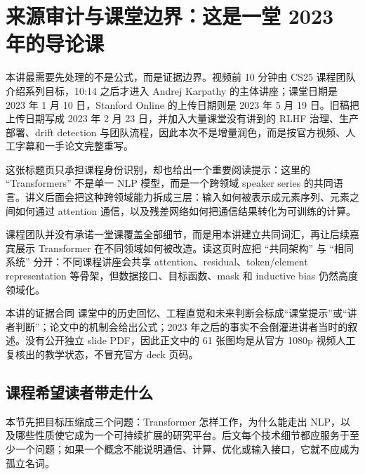 \section{来源审计与课堂边界：这是一堂 2023 年的导论课}

本讲最需要先处理的不是公式，而是证据边界。视频前 10 分钟由 CS25 课程团队介绍系列目标，10:14 之后才进入 Andrej Karpathy 的主体讲座；课堂日期是 2023 年 1 月 10 日，Stanford Online 的上传日期则是 2023 年 5 月 19 日。旧稿把上传日期写成 2023 年 2 月 23 日，并加入大量课堂没有讲到的 RLHF 治理、生产部署、drift detection 与团队流程，因此本次不是增量润色，而是按官方视频、人工字幕和一手论文完整重写。


这张标题页只承担课程身份识别，却也给出一个重要阅读提示：这里的 ``Transformers'' 不是单一 NLP 模型，而是一个跨领域 speaker series 的共同语言。讲义后面会把这种跨领域能力拆成三层：输入如何被表示成元素序列、元素之间如何通过 attention 通信，以及残差网络如何把通信结果转化为可训练的计算。


课程团队并没有承诺一堂课覆盖全部细节，而是用本讲建立共同词汇，再让后续嘉宾展示 Transformer 在不同领域如何被改造。读这页时应把 ``共同架构'' 与 ``相同系统'' 分开：不同课程讲座会共享 attention、residual、token/element representation 等骨架，但数据接口、目标函数、mask 和 inductive bias 仍然高度领域化。

\begin{importantbox}{本讲的证据合同}
课堂中的历史回忆、工程直觉和未来判断会标成“课堂提示”或“讲者判断”；论文中的机制会给出公式；2023 年之后的事实不会倒灌进讲者当时的叙述。没有公开独立 slide PDF，因此正文中的 61 张图均是从官方 1080p 视频人工复核出的教学状态，不冒充官方 deck 页码。
\end{importantbox}

\subsection{课程希望读者带走什么}

本节先把目标压缩成三个问题：Transformer 怎样工作，为什么能走出 NLP，以及哪些性质使它成为一个可持续扩展的研究平台。后文每个技术细节都应服务于至少一个问题；如果一个概念不能说明通信、计算、优化或输入接口，它就不应成为孤立名词。


